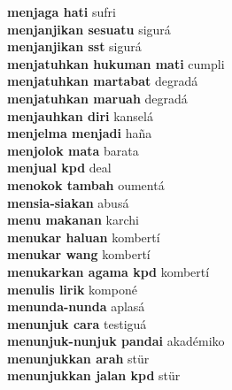 \textbf{ menjaga hati  } sufri \\
\textbf{ menjanjikan sesuatu  } sigurá \\
\textbf{ menjanjikan sst  } sigurá \\
\textbf{ menjatuhkan hukuman mati  } cumpli \\
\textbf{ menjatuhkan martabat  } degradá \\
\textbf{ menjatuhkan maruah  } degradá \\
\textbf{ menjauhkan diri  } kanselá \\
\textbf{ menjelma menjadi  } haña \\
\textbf{ menjolok mata  } barata \\
\textbf{ menjual kpd  } deal \\
\textbf{ menokok tambah  } oumentá \\
\textbf{ mensia-siakan  } abusá \\
\textbf{ menu makanan  } karchi \\
\textbf{ menukar haluan  } kombertí \\
\textbf{ menukar wang  } kombertí \\
\textbf{ menukarkan agama kpd  } kombertí \\
\textbf{ menulis lirik  } komponé \\
\textbf{ menunda-nunda  } aplasá \\
\textbf{ menunjuk cara  } testiguá \\
\textbf{ menunjuk-nunjuk pandai  } akadémiko \\
\textbf{ menunjukkan arah  } stür \\
\textbf{ menunjukkan jalan kpd  } stür \\
